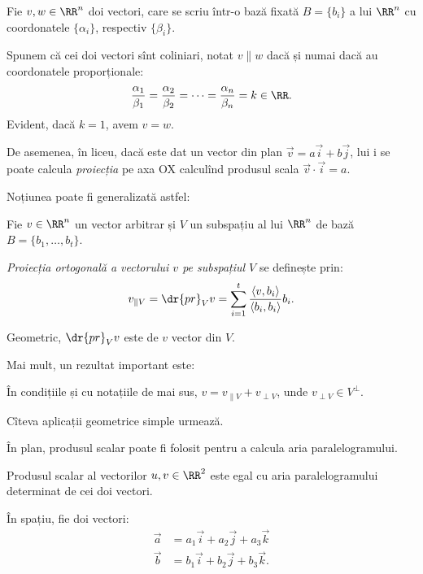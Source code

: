 \begin{definition}\label{def:vectori-col}
  Fie $ v, w \in \RR^n $ doi vectori, care se scriu într-o bază fixată
  $ B = \{ b_i \} $ a lui $ \RR^n $ cu coordonatele $ \{ \alpha_i \} $,
  respectiv $ \{ \beta_i \} $.

  Spunem că cei doi vectori sînt coliniari, notat $ v \parallel w $
  dacă și numai dacă au coordonatele proporționale:
  \[
    \dfrac{\alpha_1}{\beta_1} = \dfrac{\alpha_2}{\beta_2} = \dots = %
    \dfrac{\alpha_n}{\beta_n} = k \in \RR.
  \]
  Evident, dacă $ k = 1 $, avem $ v = w $.
\end{definition}

De asemenea, în liceu, dacă este dat un vector din plan
$ \vec{v} = a \vec{i} + b \vec{j} $, lui i se poate calcula \emph{proiecția}
pe axa OX calculînd produsul scala $ \vec{v} \cdot \vec{i} = a $.

Noțiunea poate fi generalizată astfel:

\begin{definition}\label{def:proiectie-subspatiu}
  Fie $ v \in \RR^n $ un vector arbitrar și $ V $ un subspațiu al lui $ \RR^n $
  de bază $ B = \{ b_1, \dots, b_t \} $.

  \emph{Proiecția ortogonală a vectorului $ v $ pe subspațiul $ V $} se definește
  prin:
  \[
    v_{\parallel V} = \dr{pr}_V v = \sum_{i = 1}^t \dfrac{\langle v, b_i\rangle}{%
      \langle b_i, b_i \rangle} b_i.
  \]
\end{definition}

Geometric, $ \dr{pr}_V v $ este  de $ v $ vector din $ V $.

Mai mult, un rezultat important este:
\begin{theorem}\label{thm:proi-perp}
  În condițiile și cu notațiile de mai sus, $ v = v_{\parallel V} + v_{\perp V} $,
  unde $ v_{\perp V} \in V^\perp $.
\end{theorem}

Cîteva aplicații geometrice simple urmează.

În plan, produsul scalar poate fi folosit pentru a calcula aria paralelogramului.

\begin{proposition}\label{pr:aria-paral}
  Produsul scalar al vectorilor $ u, v \in \RR^2 $ este egal cu aria
  paralelogramului determinat de cei doi vectori.
\end{proposition}

În spațiu, fie doi vectori:
\begin{align*}
  \vec{a} &= a_1 \vec{i} + a_2 \vec{j} + a_3 \vec{k} \\
  \vec{b} &= b_1 \vec{i} + b_2 \vec{j} + b_3 \vec{k}.
\end{align*}

